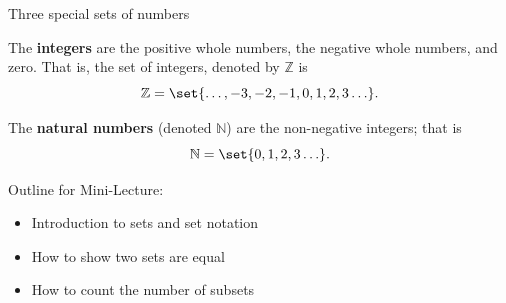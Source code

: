 \documentclass[10pt]{beamer}
\begin{document}
\begin{frame}{Three special sets of numbers}
\small 
\begin{mygreenbox}[title=Definition]
The \textbf{integers} are the positive whole numbers, the negative whole numbers, and zero.  That is, the set of integers, denoted by $\mathbb{Z}$ is
\[\mathbb{Z} = \set{\hdots, -3, -2, -1, 0, 1, 2, 3 \hdots}.\] 
\end{mygreenbox}
\vfill 
\pause 
\begin{mygreenbox}[title=Definition]
The \textbf{natural numbers} (denoted $\mathbb{N}$) are the non-negative integers; that is
\[\mathbb{N} = \set{0, 1, 2, 3 \hdots}.\] 
\end{mygreenbox}
\vfill 
\pause 

\begin{mygreenbox}[title=Definition]
\end{mygreenbox}

\end{frame}


\begin{frame}[standout]
Outline for Mini-Lecture:
\begin{itemize}
\item \textbullet \quad Introduction to sets and set notation
\item \alert{\textbullet \quad How to show two sets are equal}
\item \textbullet \quad How to count the number of subsets
\end{itemize}
\end{frame}
\end{document}
